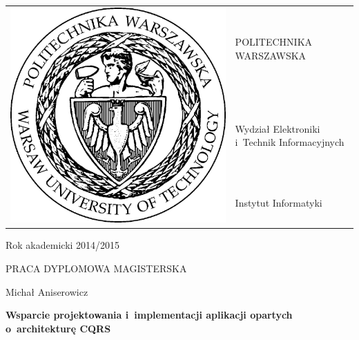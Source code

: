 \begin{titlepage}

 \begin{tabular}{ll}
  \multirow{3}{*}{\includegraphics[scale=0.3]{figures/pw.jpg}} & POLITECHNIKA WARSZAWSKA                      \\
                                                               & Wydział Elektroniki i~Technik Informacyjnych \\
                                                               & Instytut Informatyki
 \end{tabular}
 
 \begin{flushright}
  Rok akademicki 2014/2015
 \end{flushright}

 \vspace{2cm}
 
 \begin{center}
  \LARGE PRACA DYPLOMOWA MAGISTERSKA
  
  \vspace{2cm}
  
  \large Michał Aniserowicz
  
  \vspace{2cm}
  
  \textbf{Wsparcie projektowania i~implementacji aplikacji opartych o~architekturę CQRS}
 \end{center}
 

\end{titlepage}
